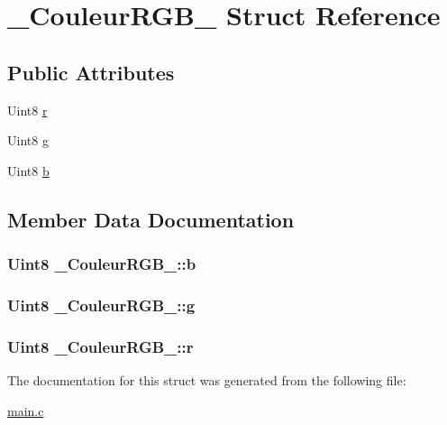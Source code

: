 \hypertarget{struct__CouleurRGB__}{}\section{\+\_\+\+Couleur\+R\+G\+B\+\_\+ Struct Reference}
\label{struct__CouleurRGB__}
\subsection*{Public Attributes}
\begin{DoxyCompactItemize}
\item 
Uint8 \hyperlink{struct__CouleurRGB___abc4afca053df5840867de93efc9e389f}{r}
\item 
Uint8 \hyperlink{struct__CouleurRGB___a87f11d82876a1d585c151d3680d6f3ed}{g}
\item 
Uint8 \hyperlink{struct__CouleurRGB___a19e6b70fca1af281ed0a24c6939904d7}{b}
\end{DoxyCompactItemize}


\subsection{Member Data Documentation}
\subsubsection[{\texorpdfstring{b}{b}}]{\setlength{\rightskip}{0pt plus 5cm}Uint8 \+\_\+\+Couleur\+R\+G\+B\+\_\+\+::b}\hypertarget{struct__CouleurRGB___a19e6b70fca1af281ed0a24c6939904d7}{}\label{struct__CouleurRGB___a19e6b70fca1af281ed0a24c6939904d7}
\subsubsection[{\texorpdfstring{g}{g}}]{\setlength{\rightskip}{0pt plus 5cm}Uint8 \+\_\+\+Couleur\+R\+G\+B\+\_\+\+::g}\hypertarget{struct__CouleurRGB___a87f11d82876a1d585c151d3680d6f3ed}{}\label{struct__CouleurRGB___a87f11d82876a1d585c151d3680d6f3ed}
\subsubsection[{\texorpdfstring{r}{r}}]{\setlength{\rightskip}{0pt plus 5cm}Uint8 \+\_\+\+Couleur\+R\+G\+B\+\_\+\+::r}\hypertarget{struct__CouleurRGB___abc4afca053df5840867de93efc9e389f}{}\label{struct__CouleurRGB___abc4afca053df5840867de93efc9e389f}


The documentation for this struct was generated from the following file\+:\begin{DoxyCompactItemize}
\item 
\hyperlink{main_8c}{main.\+c}\end{DoxyCompactItemize}
